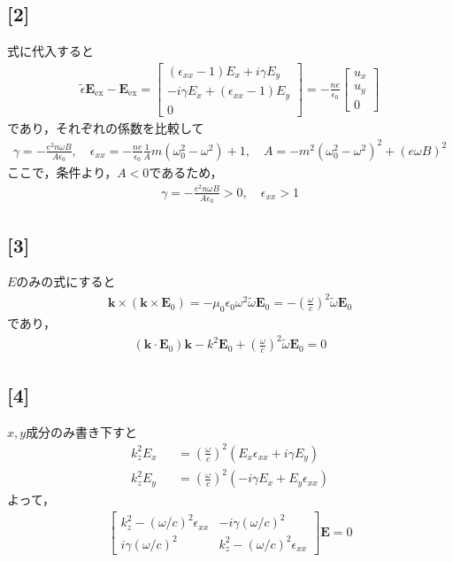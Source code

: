 \documentclass[12pt,dvipdfmx]{jsarticle}
\begin{document}
\subsection*{\large{[2]}}
式に代入すると
\begin{eqnarray}
  \tilde{\epsilon}\bm{E}_{\text{ex}} - \bm{E}_{\text{ex}} = 
  \begin{bmatrix}
    (\epsilon_{xx}-1)E_x + i\gamma E_y\\
    -i\gamma E_x + (\epsilon_{xx}-1)E_y \\
    0
  \end{bmatrix}
  =
  -\frac{ne}{\epsilon_0}
  \begin{bmatrix}
    u_x\\
    u_y\\
    0
  \end{bmatrix}
\end{eqnarray}
であり，それぞれの係数を比較して
\begin{eqnarray}
  \gamma = -\frac{e^2 n\omega B}{A\epsilon_0}, \quad \epsilon_{xx} = -\frac{ne}{\epsilon_0}\frac{1}{A}m(\omega_0^2-\omega^2)+1, \quad A = -m^2(\omega_0^2-\omega^2)^2+(e\omega B)^2
\end{eqnarray}
ここで，条件より，$A<0$であるため，
\begin{eqnarray}
  \gamma =-\frac{e^2 n\omega B}{A\epsilon_0} >0, \quad \epsilon_{xx} >1
\end{eqnarray}
\subsection*{\large{[3]}}
$E$のみの式にすると
\begin{eqnarray}
  \bm{k}\times (\bm{k}\times \bm{E}_0) = -\mu_0\epsilon_0 \omega^2 \tilde{\omega}\bm{E}_0 = -\left( \frac{\omega}{c} \right)^2 \tilde{\omega}\bm{E}_0 
\end{eqnarray}
であり，
\begin{eqnarray}
  (\bm{k}\cdot \bm{E}_0)\bm{k}-k^2 \bm{E}_0 +\left( \frac{\omega}{c} \right)^2 \tilde{\omega}\bm{E}_0 =0
\end{eqnarray}
\subsection*{\large{[4]}}
$x,y$成分のみ書き下すと
\begin{eqnarray}
  k_z^2 E_x &&= \left( \frac{\omega}{c} \right)^2 \left( E_x \epsilon_{xx} + i\gamma E_y \right)\\
  k_z^2 E_y &&= \left( \frac{\omega}{c} \right)^2 \left( -i\gamma E_x + E_y \epsilon_{xx}\right)
\end{eqnarray}
よって，
\begin{eqnarray}
  \begin{bmatrix}
    k_z^2- (\omega/c)^2\epsilon_{xx} & -i\gamma (\omega/c)^2\\
    i\gamma (\omega/c)^2 & k_z^2- (\omega/c)^2\epsilon_{xx}
  \end{bmatrix}
  \bm{E}
  =0
\end{eqnarray}
\end{document}
